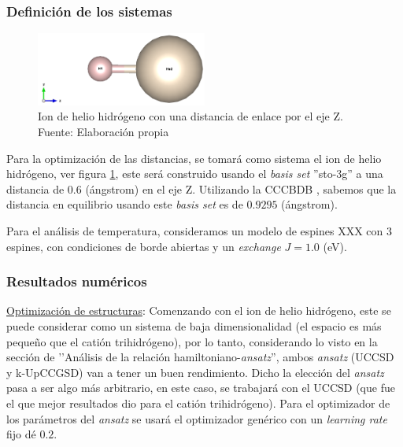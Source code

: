 \subsubsection{Definición de los sistemas}

\begin{figure}[H]
\centering
\includegraphics[width=0.5\textwidth]{figures/S4/moleculas/hhe.png}
\caption{\label{fig:hhe} Ion de helio hidrógeno con una distancia de enlace por el eje Z. Fuente: Elaboración propia}
\end{figure}


Para la optimización de las distancias, se tomará como sistema el ion de helio hidrógeno, ver figura \ref{fig:hhe}, este será construido usando el \textit{basis set} ''sto-3g'' a una distancia de $0.6$ (ángstrom) en el eje Z. Utilizando la CCCBDB \cite{CCCBDB}, sabemos que la distancia en equilibrio usando este \textit{basis set} es de $0.9295$ (ángstrom).

Para el análisis de temperatura, consideramos un modelo de espines XXX con 3 espines, con condiciones de borde abiertas y un \textit{exchange} $J = 1.0$ (eV).

\subsubsection{Resultados numéricos}

\underline{Optimización de estructuras}:
Comenzando con el ion de helio hidrógeno, este se puede considerar como un sistema de baja dimensionalidad (el espacio es más pequeño que el catión trihidrógeno), por lo tanto, considerando lo visto en la sección de '’Análisis de la relación hamiltoniano-\textit{ansatz}'', ambos \textit{ansatz} (UCCSD y k-UpCCGSD) van a tener un buen rendimiento. Dicho la elección del \textit{ansatz} pasa a ser algo más arbitrario, en este caso, se trabajará con el UCCSD (que fue el que mejor resultados dio para el catión trihidrógeno). Para el optimizador de los parámetros del \textit{ansatz} se usará el optimizador genérico con un \textit{learning rate} fijo dé $0.2$. 

